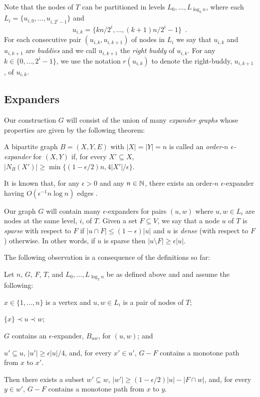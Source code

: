 \documentclass{patmorin}
\begin{document}
Note that the nodes of $T$ can be partitioned in levels $L_0,\ldots,L_{\log_2 n}$, where each $L_i=\{u_{i,0},\ldots,u_{i,2^i-1}\}$ and
\[
	u_{i,k} = \{kn/2^i,\ldots,(k+1)n/2^{i}-1\} \enspace .
\]
For each consecutive pair $(u_{i,k},u_{i,k+1})$ of nodes in $L_i$ we say
that $u_{i,k}$ and $u_{i,k+1}$ are \emph{buddies} and we call $u_{i,k+1}$
the \emph{right buddy} of $u_{i,k}$.  For any $k\in\{0,\ldots,2^{i}-1\}$,
we use the notation $r(u_{i,k})$ to denote the right-buddy, $u_{i,k+1}$,
of $u_{i,k}$.

\subsection{Expanders}

Our construction $G$ will consist of the union of many \emph{expander graphs} whose properties are given by the following theorem:

\begin{defn}
   A bipartite graph $B=(X,Y,E)$ with $|X|=|Y|=n$ is called
   an \emph{order-$n$ $\epsilon$-expander} for $(X,Y)$ if, for
   every $X'\subseteq X$, $|N_B(X')| \ge \min\{(1-\epsilon/2)n,
   4|X'|/\epsilon\}$.
\end{defn}

It is known that, for any $\epsilon >0$ and any $n\in\mathbb{N}$, there exists
an order-$n$ $\epsilon$-expander having $O(\epsilon^{-1}n\log n)$
edges \cite{X}.

Our graph $G$ will contain many $\epsilon$-expanders for pairs $(u,w)$
where $u,w\in L_i$ are nodes at the same level, $i$, of $T$.  Given a
set $F\subseteq V$, we say that a node $u$ of $T$ is \emph{sparse}
with respect to $F$ if $|u\cap F| \le (1-\epsilon)|u|$ and $u$ is
\emph{dense} (with respect to $F$) otherwise.  In other words, if $u$
is sparse then $|u\setminus F| \ge \epsilon |u|$.

The following observation is a consequence of the definitions so far:

\begin{obs}
	Let $n$, $G$, $F$, $T$, and $L_0,\ldots,L_{\log_2 n}$ be as defined above and
  and assume the following:
  \begin{compactenum}
     \item $x\in \{1,\ldots,n\}$ is a vertex and $u,w\in L_i$ 
      is a pair of nodes of $T$;
     \item $\{x\} \prec u\prec w$;
     \item $G$ contains an $\epsilon$-expander, $B_{uw}$, for $(u,w)$; and
     \item $u'\subseteq u$, $|u'|\ge\epsilon|u|/4$, and, for every $x'\in u'$, $G-F$
   contains a monotone path from $x$ to $x'$.
   \end{compactenum}
   Then there exists a
	subset $w'\subseteq w$, $|w'|\ge(1-\epsilon/2)|u|-|F\cap w|$, and, for
   every $y\in w'$, $G-F$ contains a monotone path from $x$ to $y$.
\end{obs}
\end{document}
